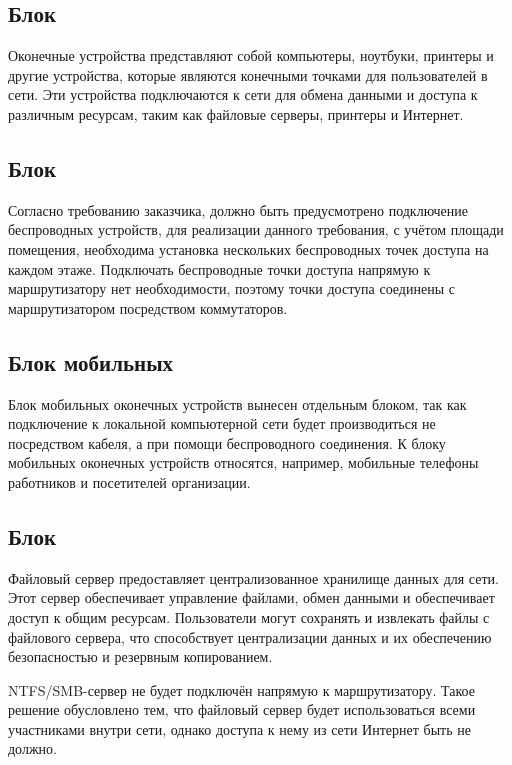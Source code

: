\subsection{Блок \moduleEndDevices}\label{subsec:struct:EndDevices}

Оконечные устройства представляют собой компьютеры, ноутбуки, принтеры и другие устройства, которые являются конечными точками для пользователей в сети.
Эти устройства подключаются к сети для обмена данными и доступа к различным ресурсам, таким как файловые серверы, принтеры и Интернет.

\subsection{Блок \moduleWiFi}\label{subsec:struct:WiFi}

Согласно требованию заказчика, должно быть предусмотрено подключение беспроводных устройств,
для реализации данного требования, с учётом площади помещения, необходима установка нескольких беспроводных точек доступа на каждом этаже.
Подключать беспроводные точки доступа напрямую к маршрутизатору нет необходимости, поэтому точки доступа соединены с маршрутизатором посредством коммутаторов.

\subsection{Блок мобильных \moduleEndDevices}\label{subsec:struct:WirelessEndDevices}

Блок мобильных оконечных устройств вынесен отдельным блоком, так как подключение к локальной компьютерной сети будет производиться не посредством кабеля,
а при помощи беспроводного соединения.
К блоку мобильных оконечных устройств относятся, например, мобильные телефоны работников и посетителей организации.

\subsection{Блок \moduleNTFS}\label{subsec:struct:Server}

Файловый сервер предоставляет централизованное хранилище данных для сети.
Этот сервер обеспечивает управление файлами, обмен данными и обеспечивает доступ к общим ресурсам.
Пользователи могут сохранять и извлекать файлы с файлового сервера, что способствует централизации данных и их обеспечению безопасностью и резервным копированием.

NTFS/SMB-сервер не будет подключён напрямую к маршрутизатору.
Такое решение обусловлено тем, что файловый сервер будет использоваться всеми участниками внутри сети,
однако доступа к нему из сети Интернет быть не должно.
